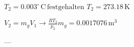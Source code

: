 \( T_2 = 0.003^\circ \, \text{C} \, \text{festgehalten} \)  
\( T_2 = 273.18 \, \text{K} \)  

\( V_2 = m_g V_1 \to \frac{R T_2}{p_2} m_g = 0.0017076 \, \text{m}^3 \)  

---